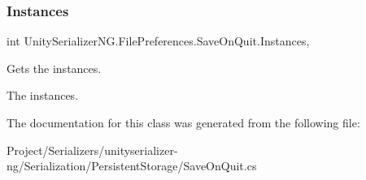 \subsubsection{\texorpdfstring{Instances}{Instances}}
{\footnotesize\ttfamily int Unity\+Serializer\+N\+G.\+File\+Preferences.\+Save\+On\+Quit.\+Instances\hspace{0.3cm}{\ttfamily [static]}, {\ttfamily [get]}}



Gets the instances. 

The instances.

The documentation for this class was generated from the following file\+:\begin{DoxyCompactItemize}
\item 
Project/\+Serializers/unityserializer-\/ng/\+Serialization/\+Persistent\+Storage/Save\+On\+Quit.\+cs\end{DoxyCompactItemize}
